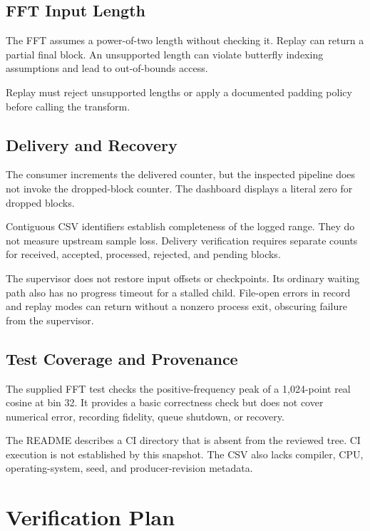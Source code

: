 \documentclass[conference]{IEEEtran}
\begin{document}
\subsection{FFT Input Length}

The FFT assumes a power-of-two length without checking it.
Replay can return a partial final block. An unsupported
length can violate butterfly indexing assumptions and
lead to out-of-bounds access.

Replay must reject unsupported lengths or apply a documented
padding policy before calling the transform.

\subsection{Delivery and Recovery}

The consumer increments the delivered counter, but the
inspected pipeline does not invoke the dropped-block
counter. The dashboard displays a literal zero for dropped
blocks.

Contiguous CSV identifiers establish completeness of the
logged range. They do not measure upstream sample loss.
Delivery verification requires separate counts for received,
accepted, processed, rejected, and pending blocks.

The supervisor does not restore input offsets or checkpoints.
Its ordinary waiting path also has no progress timeout
for a stalled child. File-open errors in record and replay
modes can return without a nonzero process exit, obscuring
failure from the supervisor.

\subsection{Test Coverage and Provenance}

The supplied FFT test checks the positive-frequency peak
of a 1,024-point real cosine at bin 32. It provides a basic
correctness check but does not cover numerical error,
recording fidelity, queue shutdown, or recovery.

The README describes a CI directory that is absent from
the reviewed tree. CI execution is not established by this
snapshot. The CSV also lacks compiler, CPU, operating-system,
seed, and producer-revision metadata.

\section{Verification Plan}
\label{sec:verification}
\end{document}
